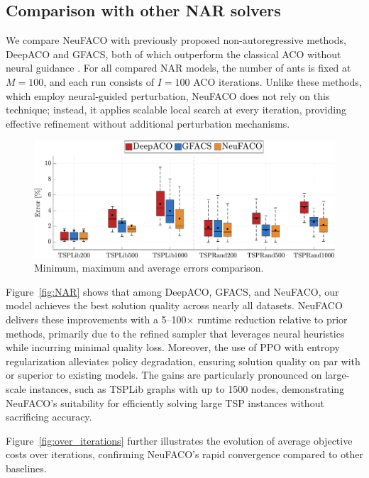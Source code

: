 \documentclass[a4paper,conference]{IEEEtran}
\begin{document}
\subsection{Comparison with other NAR solvers}
We compare NeuFACO with previously proposed non-autoregressive methods, DeepACO and GFACS, both of which outperform the classical ACO without neural guidance \cite{DeepACO,GFACS}. For all compared NAR models, the number of ants is fixed at $M=100$, and each run consists of $I=100$ ACO iterations. Unlike these methods, which employ neural-guided perturbation, NeuFACO does not rely on this technique; instead, it applies scalable local search at every iteration, providing effective refinement without additional perturbation mechanisms.

\begin{figure}[!b]
  \centering
  \includegraphics[width=\linewidth]{TSPOverview.pdf}
  \caption{Minimum, maximum and average errors comparison.}
  \label{fig:candle}
\end{figure}

Figure~\ref{fig:NAR} shows that among DeepACO, GFACS, and NeuFACO, our model achieves the best solution quality across nearly all datasets. NeuFACO delivers these improvements with a 5--100$\times$ runtime reduction relative to prior methods, primarily due to the refined sampler that leverages neural heuristics while incurring minimal quality loss. Moreover, the use of PPO with entropy regularization alleviates policy degradation, ensuring solution quality on par with or superior to existing models. The gains are particularly pronounced on large-scale instances, such as TSPLib graphs with up to 1500 nodes, demonstrating NeuFACO’s suitability for efficiently solving large TSP instances without sacrificing accuracy.

Figure~\ref{fig:over_iterations} further illustrates the evolution of average objective costs over iterations, confirming NeuFACO’s rapid convergence compared to other baselines.
\end{document}
